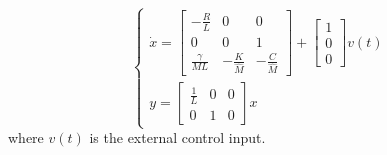 \begin{equation}
\begin{cases}
\dot{x}=\begin{bmatrix}
-\frac{R}{L} &0 & 0 \\
0 & 0 & 1 \\ 
 \frac{\gamma}{ML} & -\frac{K}{\hat{M}} & -\frac{C}{\hat{M}}
\end{bmatrix}
+
\begin{bmatrix}1 \\ 0 \\ 0\end{bmatrix} v(t) \\
y = \begin{bmatrix} \frac{1}{L} & 0 & 0 \\ 0 & 1 & 0 \end{bmatrix}x
\end{cases}
\end{equation}
where $v(t)$ is the external control input.
